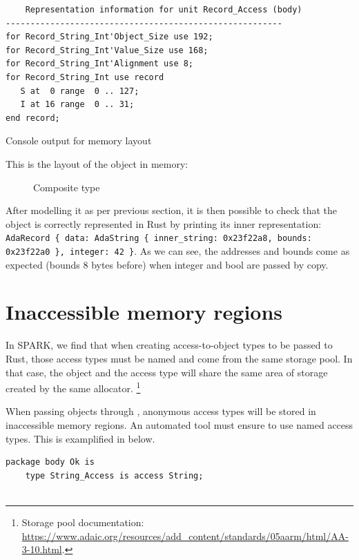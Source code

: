\documentclass[nomenclature, english, bibtex]{kththesis}
\newcommand{\inlinecode}[1]{\texttt{#1}}
\begin{document}
{\begin{listing}[!ht]
\begin{verbatim}
    Representation information for unit Record_Access (body)
--------------------------------------------------------
for Record_String_Int'Object_Size use 192;
for Record_String_Int'Value_Size use 168;
for Record_String_Int'Alignment use 8;
for Record_String_Int use record
   S at  0 range  0 .. 127;
   I at 16 range  0 .. 31;
end record;
\end{verbatim}
\caption[Memory layout output]{Console output for memory layout}
\label{lst:gnatrj}
\end{listing}
\FloatBarrier

This is the layout of the object in memory:

\begin{figure}[ht!]
    \centering
  \caption{Composite type}
  \label{fig:memlayout}
\end{figure}

After modelling it as per previous section, it is then possible to check that the object is correctly represented in Rust by printing its inner representation: 
\inlinecode{AdaRecord \{ data: AdaString \{ inner\_string: 0x23f22a8, bounds: 0x23f22a0 \}, integer: 42 \}}. As we can see, the addresses and bounds come as expected (bounds 8 bytes before) when integer and bool are passed by copy.

\section{Inaccessible memory regions}

In SPARK, we find that when creating access-to-object types to be passed to Rust, those access types must be named and come from the same storage pool. In that case, the object and the access type will share the same area of storage created by the same allocator. \footnote{Storage pool documentation: \url{https://www.adaic.org/resources/add_content/standards/05aarm/html/AA-3-10.html}.}  

When passing objects through , anonymous access types will be stored in inaccessible memory regions. An automated tool must ensure to use named access types. This is examplified in  below.


\begin{listing}[!ht]
\begin{verbatim}
package body Ok is
    type String_Access is access String;
  

\end{verbatim}
\end{listing}}
\end{document}
